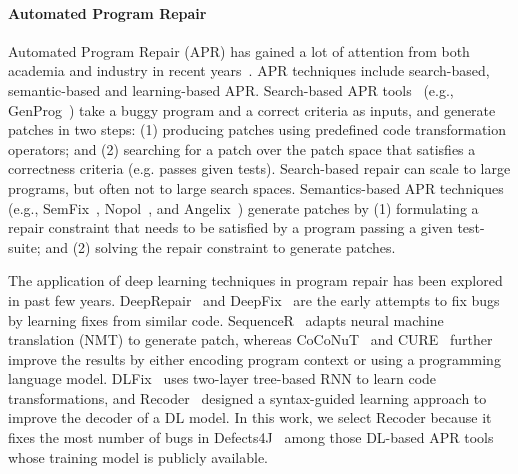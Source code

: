 \paragraph*{Automated Program Repair} Automated Program Repair (APR) has gained a lot of attention from both academia and industry in recent years~\cite{cacm19}. APR techniques include search-based, semantic-based and learning-based APR. Search-based APR tools~\cite{relifix,droix, capgen, simfix, F1X, arja, tbar, liu2019avatar} (e.g., GenProg~\cite{genprog}) take a buggy program and a correct criteria as inputs, and generate patches in two steps: (1) producing patches using predefined code transformation operators; and (2) searching for a patch over the patch space that satisfies a correctness criteria (e.g. passes given tests). Search-based repair can scale to large programs, but often not to large search spaces. Semantics-based APR techniques (e.g., SemFix~\cite{semfix}, Nopol~\cite{NOPOL}, and Angelix~\cite{angelix}) generate patches by (1) formulating a repair constraint that needs to be satisfied by a program passing a given test-suite; and (2) solving the repair constraint to generate patches.

The application of deep learning techniques in program repair has been explored in past few years. DeepRepair~\cite{deeprepair} and DeepFix~\cite{gupta2017deepfix} are the early attempts to fix bugs by learning fixes from similar code. SequenceR~\cite{chen2019sequencer} adapts neural machine translation (NMT) to generate patch, whereas CoCoNuT~\cite{lutellier2020coconut} and CURE~\cite{jiang2021cure} further improve the results by either encoding program context or using a programming language model. DLFix~\cite{li2020dlfix} uses two-layer tree-based RNN to learn code transformations, and Recoder~\cite{recoder} designed a syntax-guided learning approach to improve the decoder of a DL model. In this work, we select Recoder because it fixes the most number of bugs in Defects4J~\cite{defects4j} among those DL-based APR tools whose training model is publicly available.

